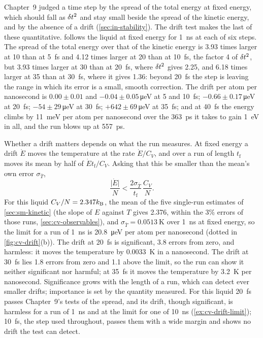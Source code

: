 Chapter~9 judged a time step by the spread of the total energy at fixed
energy, which should fall as $\delta t^2$ and stay small beside the spread of
the kinetic energy, and by the absence of a drift (\cref{sec:in-stability}).
The drift test makes the last of these quantitative.
 follows the liquid at fixed energy for
\SI{1}{\nano\second} at each of six steps. The spread of the total energy
over that of the kinetic energy is 3.93 times larger at 10 than at
\SI{5}{\femto\second} and 4.12 times larger at 20 than at
\SI{10}{\femto\second}, the factor 4 of $\delta t^2$, but 3.93 times larger at
30 than at \SI{20}{\femto\second}, where $\delta t^2$ gives 2.25, and 6.18 times
larger at 35 than at \SI{30}{\femto\second}, where it gives 1.36: beyond
\SI{20}{\femto\second} the step is leaving the range in which its error is
a small, smooth correction. The drift per atom per nanosecond is $0.00
\pm 0.01$ and $-0.04 \pm 0.05$\,\si{\micro\electronvolt} at 5 and
\SI{10}{\femto\second}; $-0.66 \pm 0.17$\,\si{\micro\electronvolt} at
\SI{20}{\femto\second}; $-54 \pm 29$\,\si{\micro\electronvolt} at
\SI{30}{\femto\second}; $+642 \pm 69$\,\si{\micro\electronvolt} at
\SI{35}{\femto\second}; and at \SI{40}{\femto\second} the energy climbs by
\SI{11}{\milli\electronvolt} per atom per nanosecond over the
\SI{363}{\pico\second} it takes to gain \SI{1}{\electronvolt} in all, and
the run blows up at \SI{557}{\pico\second}.

Whether a drift matters depends on what the run measures. At fixed energy
a drift $\dot E$ moves the temperature at the rate $\dot E/C_V$, and over
a run of length $t_{\mathrm f}$ moves its mean by half of $\dot
Et_{\mathrm f}/C_V$. Asking that this be smaller than the mean's own error
$\sigma_{\bar T}$,
\begin{equation*}
   \frac{\lvert\dot E\rvert}{N} < \frac{2\sigma_{\bar T}}{t_{\mathrm f}}\,
   \frac{C_V}{N} .
\end{equation*}
For this liquid $C_V/N = 2.347k_{\mathrm{B}}$, the mean of the five single-run
estimates of \cref{sec:sm-kinetic} (the slope of $E$ against $T$ gives
2.376, within the 3\% errors of those runs, \cref{sec:cv-observables}), and $\sigma_{\bar T} =
\SI{0.0513}{\kelvin}$ over \SI{1}{\nano\second} at fixed
energy, so the limit for a run of \SI{1}{\nano\second} is
\SI{20.8}{\micro\electronvolt} per atom per nanosecond (dotted in
\cref{fig:cv-drift}(b)). The drift at \SI{20}{\femto\second} is significant,
3.8 errors from zero, and harmless: it moves the temperature by
\SI{0.0033}{\kelvin} in a nanosecond. The drift at \SI{30}{\femto\second}
lies 1.8 errors from zero and 1.1 above the limit, so the run can show it
neither significant nor harmful; at \SI{35}{\femto\second} it moves the
temperature by \SI{3.2}{\kelvin} per nanosecond. Significance grows with the length of a run, which can detect
ever smaller drifts; importance is set by the quantity measured. For this liquid \SI{20}{\femto\second} passes Chapter~9's tests
of the spread, and its drift, though significant, is harmless for a run of
\SI{1}{\nano\second} and at the limit for one of \SI{10}{\nano\second}
(\cref{ex:cv-drift-limit}); \SI{10}{\femto\second}, the step used
throughout, passes them with a wide margin and shows no drift the test can
detect.

